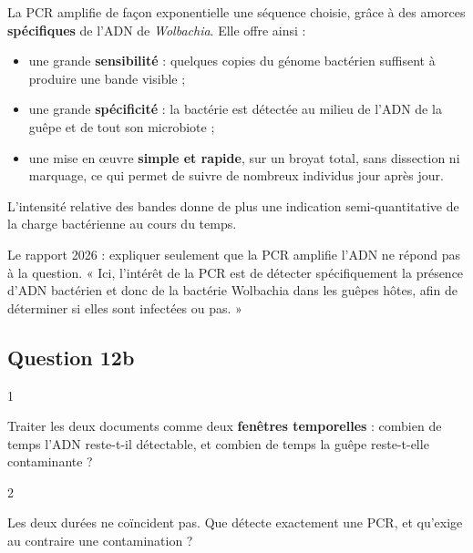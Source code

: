 \documentclass[11pt,a4paper]{article}
\providecommand{\tightlist}{\setlength{\itemsep}{0pt}\setlength{\parskip}{0pt}}
\begin{document}
La PCR amplifie de façon exponentielle une séquence choisie, grâce à des amorces \textbf{spécifiques} de l'ADN de \emph{Wolbachia}. Elle offre ainsi :

\begin{itemize}
\tightlist
\item
  une grande \textbf{sensibilité} : quelques copies du génome bactérien suffisent à produire une bande visible ;
\item
  une grande \textbf{spécificité} : la bactérie est détectée au milieu de l'ADN de la guêpe et de tout son microbiote ;
\item
  une mise en œuvre \textbf{simple et rapide}, sur un broyat total, sans dissection ni marquage, ce qui permet de suivre de nombreux individus jour après jour.
\end{itemize}

L'intensité relative des bandes donne de plus une indication semi-quantitative de la charge bactérienne au cours du temps.

\begin{jury}

Le rapport 2026 : expliquer seulement que la PCR amplifie l'ADN ne répond pas à la question. « Ici, l'intérêt de la PCR est de détecter spécifiquement la présence d'ADN bactérien et donc de la bactérie Wolbachia dans les guêpes hôtes, afin de déterminer si elles sont infectées ou pas. »

\end{jury}

\hypertarget{question-12b}{%
\subsection{Question 12b}\label{question-12b}}

\begin{indication}{1}

Traiter les deux documents comme deux \textbf{fenêtres temporelles} : combien de temps l'ADN reste-t-il détectable, et combien de temps la guêpe reste-t-elle contaminante ?

\end{indication}

\begin{indication}{2}

Les deux durées ne coïncident pas. Que détecte exactement une PCR, et qu'exige au contraire une contamination ?

\end{indication}
\end{document}
